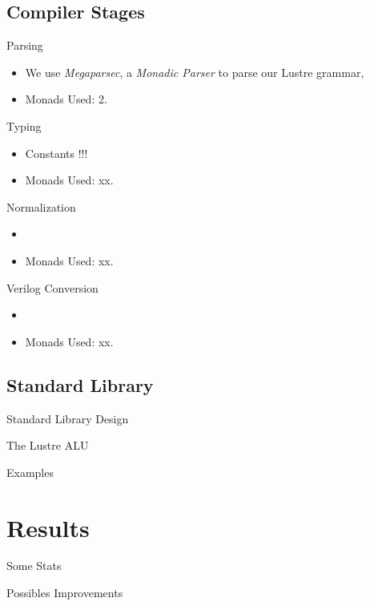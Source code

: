 \documentclass{beamer}
\begin{document}
\subsection{Compiler Stages}

\begin{frame}{Parsing}
    \begin{itemize}
        \setlength{\itemsep}{8pt}
        \item We use \emph{Megaparsec}, a \emph{Monadic Parser} to parse our Lustre grammar,
        \item Monads Used: 2.
    \end{itemize}
\end{frame}

\begin{frame}{Typing}
    \begin{itemize}
        \setlength{\itemsep}{8pt}
        \item Constants !!!
        \item Monads Used: xx.
    \end{itemize}
\end{frame}

\begin{frame}{Normalization}
    \begin{itemize}
        \setlength{\itemsep}{8pt}
        \item
        \item Monads Used: xx.
    \end{itemize}
\end{frame}

\begin{frame}{Verilog Conversion}
    \begin{itemize}
        \setlength{\itemsep}{8pt}
        \item
        \item Monads Used: xx.
    \end{itemize}
\end{frame}

\subsection{Standard Library}

\begin{frame}{Standard Library Design}

\end{frame}

\begin{frame}{The Lustre ALU}

\end{frame}

\begin{frame}{Examples}

\end{frame}

\section{Results}

\begin{frame}{Some Stats}

\end{frame}

\begin{frame}{Possibles Improvements}

\end{frame}
\end{document}
